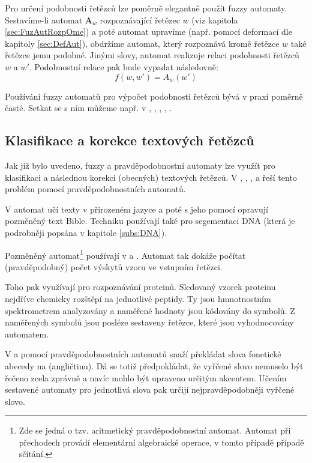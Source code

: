 \documentclass[a4paper,10pt]{article}
\begin{document}
Pro určení podobnosti řetězců lze poměrně elegantně použít fuzzy automaty. Sestavíme-li automat $\mathbf{A}_w$ rozpoznávající řetězec $w$ (viz kapitola \ref{sec:FuzAutRozpOme}) a poté automat upravíme (např. pomocí deformací dle kapitoly \ref{sec:DefAut}), obdržíme automat, který rozpoznává kromě řetězce $w$ také řetězce jemu podobné. Jinými slovy, automat realizuje relaci podobnosti řetězců $w$ a $w'$. Podobnostní relace pak bude vypadat následovně:
$$
   f(w, w') = A_w(w')
$$

Používání fuzzy automatů pro výpočet podobnosti řetězců bývá v praxi poměrně časté. Setkat se s ním můžeme např. v \cite{AndAbdAsm-ApprPattMatcFuzzLog}, \cite{Gar+-DefFuzAutCorImpStrFuzSym}, \cite{Ast+-ImpStrMaExpUsDefFuzAut}, \cite{RamGir-ConvFinAutFuzzAutStrComp}, \cite{SetWar-FuzzAutPattMatc}.

\subsection{Klasifikace a korekce textových řetězců}
Jak již bylo uvedeno, fuzzy a pravděpodobnostní automaty lze využít pro klasifikaci a následnou korekci (obecných) textových řetězců. V \cite{HigOnc-ComMosProStrProFiStaMa}, \cite{Mar+-ProAriAutApp}, \cite{Her-ProAriAutAppSoComFraBioSeqAna}, \cite{YorSinTis-PowAmnLeaPrAuVarMemLen} a \cite{Ron-AutLeaApp} řeší tento problém pomocí pravděpodobnostních automatů.

V \cite{Ron-AutLeaApp} automat učí texty v přirozeném jazyce a poté s jeho pomocí opravují pozměněný text Bible. Techniku používají také pro segementaci DNA (která je podrobněji popsána v kapitole \ref{subs:DNA}).

Pozměněný automat\footnote{Zde se jedná o tzv. aritmetický pravděpodobnostní automat. Automat při přechodech provádí elementární algebraické operace, v tomto případě případě sčítání.} používají v \cite{Mar+-ProAriAutApp} a \cite{Her-ProAriAutAppSoComFraBioSeqAna}. Automat tak dokáže počítat (pravděpodobný) počet výskytů vzoru ve vstupním řetězci.

Toho pak využívají pro rozpoznávání proteinů. Sledovaný vzorek proteinu nejdříve chemicky rozštěpí na jednotlivé peptidy. Ty jsou hmnotnostním spektrometrem analyzovány a naměřené hodnoty jsou kódovány do symbolů. Z naměřených symbolů jsou posléze sestaveny řetězce, které jsou vyhodnocovány automatem.

V \cite{MohPerRoe-WeiFinStaTraSpeRec} a \cite{BahJel-DecChaWinDelSubApSpeRec} pomocí pravděpodobnostních automatů snaží překládat slova fonetické abecedy na  (angličtinu). Dá se totiž předpokládat, že vyřčené slovo nemuselo být řečeno zcela zprávně a navíc mohlo být upraveno určitým akcentem. Učením sestavené automaty pro jednotlivá slova pak určijí nejpravděpodobněji vyřčené slovo.
\end{document}
